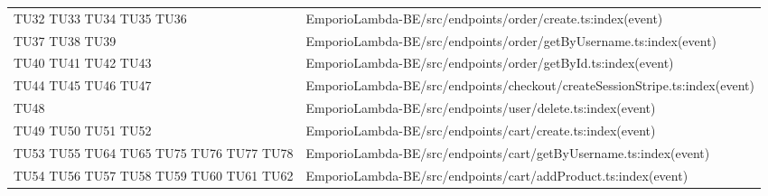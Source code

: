 {\begin{longtable}{C{2cm} C{12.8cm}}
TU32 \newline TU33 \newline TU34 \newline TU35 \newline TU36 & EmporioLambda-BE/src/endpoints/order/create.ts:index(event)\\

TU37 \newline TU38 \newline TU39 & EmporioLambda-BE/src/endpoints/order/getByUsername.ts:index(event)\\

TU40 \newline TU41 \newline TU42 \newline TU43 & EmporioLambda-BE/src/endpoints/order/getById.ts:index(event)\\

TU44 \newline TU45 \newline TU46 \newline TU47 & EmporioLambda-BE/src/endpoints/checkout/createSessionStripe.ts:index(event)\\

TU48 & EmporioLambda-BE/src/endpoints/user/delete.ts:index(event)\\

TU49 \newline TU50 \newline TU51 \newline TU52 & EmporioLambda-BE/src/endpoints/cart/create.ts:index(event)\\

TU53 \newline TU55 \newline TU64 \newline TU65 \newline TU75 \newline TU76 \newline TU77 \newline TU78 & EmporioLambda-BE/src/endpoints/cart/getByUsername.ts:index(event)\\

TU54 \newline TU56 \newline TU57 \newline TU58 \newline TU59 \newline TU60 \newline TU61 \newline TU62 & EmporioLambda-BE/src/endpoints/cart/addProduct.ts:index(event)\\


\end{longtable}}

